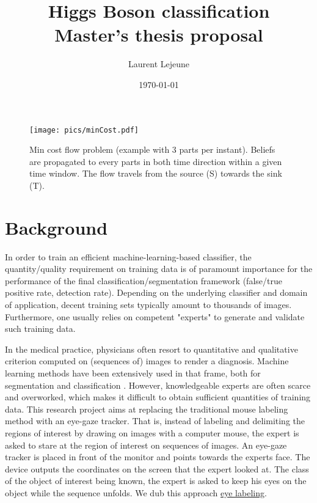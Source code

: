 \documentclass[11pt]{article}
\author{Laurent Lejeune}
\date{\today}
\title{Higgs Boson classification\\\medskip
\large Master's thesis proposal}
\begin{document}
\maketitle
\begin{figure}\centering
{} 
\end{figure}

\begin{figure}[htb]
\centering
\texttt{[image: pics/minCost.pdf]}
\caption{\label{fig:orgparagraph1}
Min cost flow problem (example with 3 parts per instant). Beliefs are propagated to every parts in both time direction within a given time window. The flow travels from the source (S) towards the sink (T).}
\end{figure}

\section{Background}
\label{sec:orgheadline1}
In order to train an efficient machine-learning-based classifier, the quantity/quality requirement on training data is of paramount importance for the performance of the final classification/segmentation framework (false/true positive rate, detection rate). Depending on the underlying classifier and domain of application, decent training sets typically amount to thousands of images. Furthermore, one usually relies on competent "experts" to generate and validate such training data.

In the medical practice, physicians often resort to quantitative and qualitative criterion computed on (sequences of) images to render a diagnosis. Machine learning methods have been extensively used in that frame, both for segmentation and classification \cite{vijayakumar2007,gasmi2012,powell2008}. However, knowledgeable experts are often scarce and overworked, which makes it difficult to obtain sufficient quantities of training data. This research project aims at replacing the traditional mouse labeling method with an eye-gaze tracker. That is, instead of labeling and delimiting the regions of interest by drawing on images with a computer mouse, the expert is asked to stare at the region of interest on sequences of images. An eye-gaze tracker is placed in front of the monitor and points towards the experts face. The device outputs the coordinates on the screen that the expert looked at. The class of the object of interest being known, the expert is asked to keep his eyes on the object while the sequence unfolds. We dub this approach \uline{eye labeling}.
\end{document}
